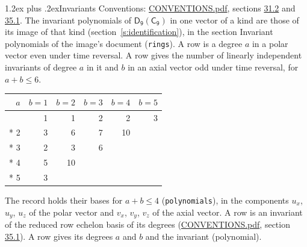 \documentclass[10pt,a4paper]{article}
\makeatletter
\renewcommand\section{\@startsection{section}{1}{\z@}{-3ex plus -1ex minus -.2ex}%
  {1.2ex plus .2ex}{\normalfont\large\sffamily\bfseries\color{parttitle}}}
\numberwithin{equation}{section}
\newcommand{\grp}[1]{\mathsf{#1}}
\makeatother
\begin{document}
\section{Invariants}\label{s:invariants}
Conventions: \href{../../CONVENTIONS.pdf}{CONVENTIONS.pdf}, sections \href{../../CONVENTIONS.pdf\#conv.31.2}{31.2} and \href{../../CONVENTIONS.pdf\#conv.35.1}{35.1}.
The invariant polynomials of $\grp{D_{9}}(\grp{C_{9}})$ in one vector of a kind are those of its image of that kind (section~\ref{s:identification}), in the section Invariant polynomials of the image's document (\texttt{rings}).
\leavevmode\label{n:index.degree.polar}\label{n:index.degree.axial}A row is a degree $a$ in a polar vector even under time reversal. A row gives the number of linearly independent invariants of degree $a$ in it and $b$ in an axial vector odd under time reversal, for $a + b \le 6$.
{\small\begin{longtable}{@{}rrrrrr@{}}\toprule
$a$ & $b = 1$ & $b = 2$ & $b = 3$ & $b = 4$ & $b = 5$\\\midrule\endhead
\bottomrule\endfoot\endlastfoot
1 & 1 & 1 & 2 & 2 & 3\\*
2 & 3 & 6 & 7 & 10 & \\*
3 & 2 & 3 & 6 &  & \\*
4 & 5 & 10 &  &  & \\*
5 & 3 &  &  &  & \\
\bottomrule\end{longtable}}
\leavevmode\label{n:local.component.polar}\label{n:local.component.axial}The record holds their bases for $a + b \le 4$ (\texttt{polynomials}), in the components $u_{x}$, $u_{y}$, $u_{z}$ of the polar vector and $v_{x}$, $v_{y}$, $v_{z}$ of the axial vector. \label{n:head.polynomial}A row is an invariant of the reduced row echelon basis of its degrees (\href{../../CONVENTIONS.pdf}{CONVENTIONS.pdf}, section \href{../../CONVENTIONS.pdf\#conv.35.1}{35.1}). A row gives its degrees $a$ and $b$ and the invariant (polynomial).
\end{document}
